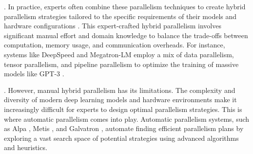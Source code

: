 . In practice, experts often combine these parallelism techniques to create hybrid parallelism strategies tailored to the specific requirements of their models and hardware configurations \cite{song2019hypar}. 
This expert-crafted hybrid parallelism involves significant manual effort and domain knowledge to balance the trade-offs between computation, memory usage, and communication overheads. 
For instance, systems like DeepSpeed \cite{rasley2020deepspeed} and Megatron-LM \cite{narayanan2021efficient} employ a mix of data parallelism, tensor parallelism, and pipeline parallelism to optimize the training of massive models like GPT-3 \cite{achiam2023gpt}.

. However, manual hybrid parallelism has its limitations. The complexity and diversity of modern deep learning models and hardware environments make it increasingly difficult for experts to design optimal parallelism strategies. 
This is where automatic parallelism comes into play. Automatic parallelism systems, such as Alpa \cite{zheng2022alpa}, Metis \cite{um2024metis}, and Galvatron \cite{miao2022galvatron}, automate finding efficient parallelism plans by exploring a vast search space of potential strategies using advanced algorithms and heuristics.




